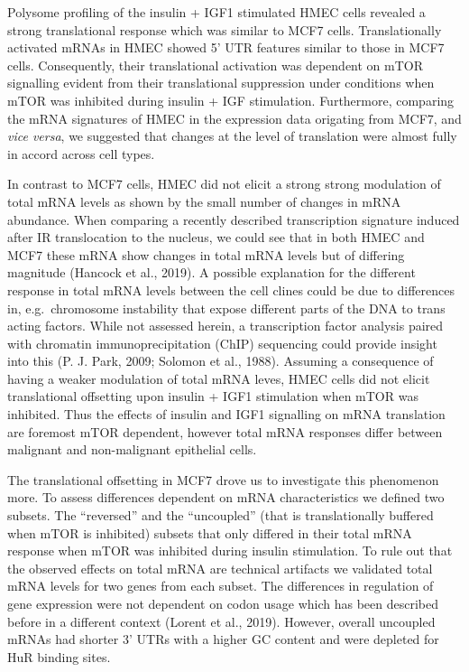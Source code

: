 \documentclass[12pt,openany]{book}
\begin{document}
Polysome profiling of the insulin + IGF1 stimulated HMEC cells revealed
a strong translational response which was similar to MCF7 cells.
Translationally activated mRNAs in HMEC showed 5' UTR features similar
to those in MCF7 cells. Consequently, their translational activation was
dependent on mTOR signalling evident from their translational
suppression under conditions when mTOR was inhibited during insulin +
IGF stimulation. Furthermore, comparing the mRNA signatures of HMEC in
the expression data origating from MCF7, and \emph{vice versa}, we
suggested that changes at the level of translation were almost fully in
accord across cell types.

In contrast to MCF7 cells, HMEC did not elicit a strong strong
modulation of total mRNA levels as shown by the small number of changes
in mRNA abundance. When comparing a recently described transcription
signature induced after IR translocation to the nucleus, we could see
that in both HMEC and MCF7 these mRNA show changes in total mRNA levels
but of differing magnitude (Hancock et al., 2019). A possible
explanation for the different response in total mRNA levels between the
cell clines could be due to differences in, e.g.~chromosome instability
that expose different parts of the DNA to trans acting factors. While
not assessed herein, a transcription factor analysis paired with
chromatin immunoprecipitation (ChIP) sequencing could provide insight
into this (P. J. Park, 2009; Solomon et al., 1988). Assuming a
consequence of having a weaker modulation of total mRNA leves, HMEC
cells did not elicit translational offsetting upon insulin + IGF1
stimulation when mTOR was inhibited. Thus the effects of insulin and
IGF1 signalling on mRNA translation are foremost mTOR dependent, however
total mRNA responses differ between malignant and non-malignant
epithelial cells.

The translational offsetting in MCF7 drove us to investigate this
phenomenon more. To assess differences dependent on mRNA characteristics
we defined two subsets. The ``reversed'' and the ``uncoupled'' (that is
translationally buffered when mTOR is inhibited) subsets that only
differed in their total mRNA response when mTOR was inhibited during
insulin stimulation. To rule out that the observed effects on total mRNA
are technical artifacts we validated total mRNA levels for two genes
from each subset. The differences in regulation of gene expression were
not dependent on codon usage which has been described before in a
different context (Lorent et al., 2019). However, overall uncoupled
mRNAs had shorter 3' UTRs with a higher GC content and were depleted for
HuR binding sites.
\end{document}
